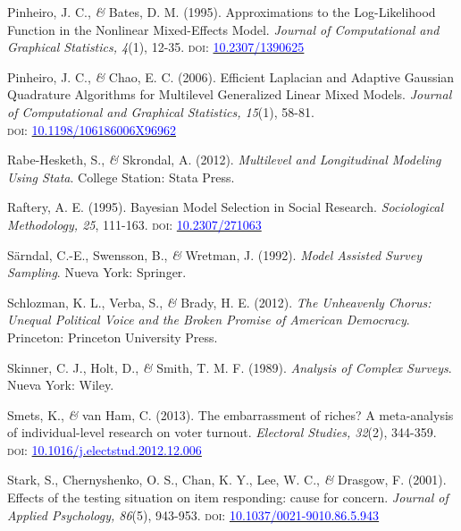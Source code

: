 \documentclass[a4paper]{tufte-handout}
\begin{document}
{{{{{{{{{{{{{\begin{list}{}
\item{\small Pinheiro, J. C., {\itshape \&} Bates, D. M. (1995). Approximations to the Log-Likelihood Function in the Nonlinear Mixed-Effects Model. {\itshape Journal of Computational and Graphical Statistics, 4}(1), 12-35. {\scshape doi:} \href{http://doi.org/10.2307/1390625}{\textcolor{blue}{10.2307/1390625}}}

\item{\small Pinheiro, J. C., {\itshape \&} Chao, E. C. (2006). Efficient Laplacian and Adaptive Gaussian Quadrature Algorithms for Multilevel Generalized Linear Mixed Models. {\itshape Journal of Computational and Graphical Statistics, 15}(1), 58-81. \\ {\scshape doi:} \href{https://doi.org/10.1198/106186006X96962}{\textcolor{blue}{10.1198/106186006X96962}}}

\item{\small Rabe-Hesketh, S., {\itshape \&} Skrondal, A. (2012). {\itshape Multilevel and Longitudinal Modeling Using Stata}. College Station: Stata Press.}

\item{\small Raftery, A. E. (1995). Bayesian Model Selection in Social Research. {\itshape Sociological Methodology, 25}, 111-163. {\scshape doi:} \href{http://doi.org/10.2307/271063}{\textcolor{blue}{10.2307/271063}}}

\item{\small Särndal, C.-E., Swensson, B., {\itshape \&} Wretman, J. (1992). {\itshape Model Assisted Survey Sampling}. Nueva York: Springer.}

\item{\small Schlozman, K. L., Verba, S., {\itshape \&} Brady, H. E. (2012). {\itshape The Unheavenly Chorus: Unequal Political Voice and the Broken Promise of American Democracy}. Princeton: Princeton University Press.}

\item{\small Skinner, C. J., Holt, D., {\itshape \&} Smith, T. M. F. (1989). {\itshape Analysis of Complex Surveys}. Nueva York: Wiley.}

\item{\small Smets, K., {\itshape \&} van Ham, C. (2013). The embarrassment of riches? A meta-analysis of individual-level research on voter turnout. {\itshape Electoral Studies, 32}(2), 344-359. {\scshape doi:} \href{https://doi.org/10.1016/j.electstud.2012.12.006}{\textcolor{blue}{10.1016/j.electstud.2012.12.006}}}

\item{\small Stark, S., Chernyshenko, O. S., Chan, K. Y., Lee, W. C., {\itshape \&} Drasgow, F. (2001). Effects of the testing situation on item responding: cause for concern. {\itshape Journal of Applied Psychology, 86}(5), 943-953. {\scshape doi:} \href{https://doi.org/10.1037/0021-9010.86.5.943}{\textcolor{blue}{10.1037/0021-9010.86.5.943}}}


\end{list}}}}}}}}}}}}}}
\end{document}
